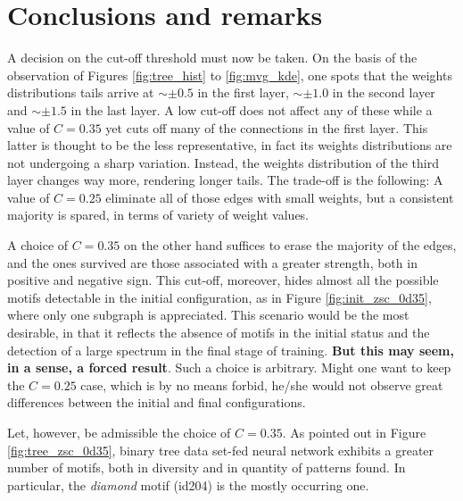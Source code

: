 \documentclass[a4paper,12pt]{article}
\begin{document}
\section{Conclusions and remarks}
\label{sec:conclusions}

A decision on the cut-off threshold must now be taken. On the basis of the observation of Figures \ref{fig:tree_hist} to \ref{fig:mvg_kde}, one spots that the weights distributions tails arrive at $\sim \pm 0.5$ in the first layer, $\sim \pm 1.0$ in the second layer and $\sim \pm 1.5$ in the last layer. A low cut-off does not affect any of these while a value of $C = 0.35$ yet cuts off many of the connections in the first layer. This latter is thought to be the less representative, in fact its weights distributions are not undergoing a sharp variation. Instead, the weights distribution of the third layer changes way more, rendering longer tails. The trade-off is the following: A value of $C = 0.25$ eliminate all of those edges with small weights, but a consistent majority is spared, in terms of variety of weight values. 

A choice of $C = 0.35$ on the other hand suffices to erase the majority of the edges, and the ones survived are those associated with a greater strength, both in positive and negative sign. This cut-off, moreover, hides almost all the possible motifs detectable in the initial configuration, as in Figure \ref{fig:init_zsc_0d35}, where only one subgraph is appreciated. This scenario would be the most desirable, in that it reflects the absence of motifs in the initial status and the detection of a large spectrum in the final stage of training. \textbf{But this may seem, in a sense, a forced result}. Such a choice is arbitrary. Might one want to keep the $C = 0.25$ case, which is by no means forbid, he/she would not observe great differences between the initial and final configurations. 

Let, however, be admissible the choice of $C = 0.35$. As pointed out in Figure \ref{fig:tree_zsc_0d35}, binary tree data set-fed neural network exhibits a greater number of motifs, both in diversity and in quantity of patterns found. In particular, the \textit{diamond} motif (id204) is the mostly occurring one. 
\end{document}
